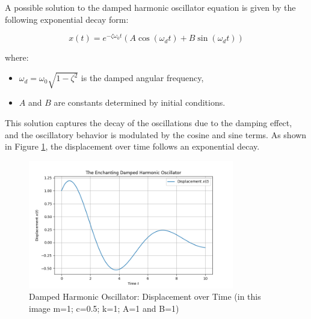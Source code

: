 \documentclass{article}
\begin{document}
A possible solution to the damped harmonic oscillator equation is given by the following exponential decay form:

\begin{equation}
    x(t) = e^{-\zeta\omega_0 t}\left(A\cos(\omega_dt) + B\sin(\omega_dt)\right)
\end{equation}

where:
\begin{itemize}
    \item $\omega_d = \omega_0\sqrt{1-\zeta^2}$ is the damped angular frequency,
    \item $A$ and $B$ are constants determined by initial conditions.
\end{itemize}

This solution captures the decay of the oscillations due to the damping effect, and the oscillatory behavior is modulated by the cosine and sine terms.
As shown in Figure \ref{fig:damped_harmonic_oscillator}, the displacement over time follows an exponential decay.

\begin{figure}[h]
    \centering
    \includegraphics[width=0.8\textwidth]{Figuretest.png} 
    \caption{Damped Harmonic Oscillator: Displacement over Time (in this image m=1; c=0.5; k=1; A=1 and B=1)}
    \label{fig:damped_harmonic_oscillator}
\end{figure}
\end{document}
